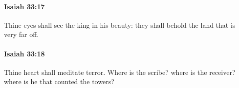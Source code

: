 		\paragraph{Isaiah 33:17} %
			\label{ISAIAH-33-17}

			Thine eyes shall see the king in his beauty: they shall behold the land that is very far off.


		\paragraph{Isaiah 33:18} %
			\label{ISAIAH-33-18}

			Thine heart shall meditate terror. Where is the scribe? where is the receiver? where is he that counted the towers?



